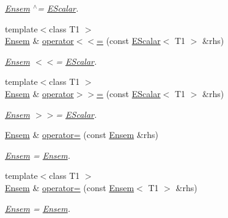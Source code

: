 \begin{DoxyCompactItemize}
\begin{DoxyCompactList}\small\item\em \mbox{\hyperlink{classENSEM_1_1Ensem}{Ensem}} $^\wedge$= \mbox{\hyperlink{classENSEM_1_1EScalar}{E\+Scalar}}. \end{DoxyCompactList}\item 
{\footnotesize template$<$class T1 $>$ }\\\mbox{\hyperlink{classENSEM_1_1Ensem}{Ensem}} \& \mbox{\hyperlink{classENSEM_1_1Ensem_a9aecabccdc31d9b43db877a82879f702}{operator$<$$<$=}} (const \mbox{\hyperlink{classENSEM_1_1EScalar}{E\+Scalar}}$<$ T1 $>$ \&rhs)
\begin{DoxyCompactList}\small\item\em \mbox{\hyperlink{classENSEM_1_1Ensem}{Ensem}} $<$$<$= \mbox{\hyperlink{classENSEM_1_1EScalar}{E\+Scalar}}. \end{DoxyCompactList}\item 
{\footnotesize template$<$class T1 $>$ }\\\mbox{\hyperlink{classENSEM_1_1Ensem}{Ensem}} \& \mbox{\hyperlink{classENSEM_1_1Ensem_a9511b1d1b45de39920d451700eecd4d9}{operator$>$$>$=}} (const \mbox{\hyperlink{classENSEM_1_1EScalar}{E\+Scalar}}$<$ T1 $>$ \&rhs)
\begin{DoxyCompactList}\small\item\em \mbox{\hyperlink{classENSEM_1_1Ensem}{Ensem}} $>$$>$= \mbox{\hyperlink{classENSEM_1_1EScalar}{E\+Scalar}}. \end{DoxyCompactList}\item 
\mbox{\hyperlink{classENSEM_1_1Ensem}{Ensem}} \& \mbox{\hyperlink{classENSEM_1_1Ensem_a2f4f881dde88dfaf425051580e477e6c}{operator=}} (const \mbox{\hyperlink{classENSEM_1_1Ensem}{Ensem}} \&rhs)
\begin{DoxyCompactList}\small\item\em \mbox{\hyperlink{classENSEM_1_1Ensem}{Ensem}} = \mbox{\hyperlink{classENSEM_1_1Ensem}{Ensem}}. \end{DoxyCompactList}\item 
{\footnotesize template$<$class T1 $>$ }\\\mbox{\hyperlink{classENSEM_1_1Ensem}{Ensem}} \& \mbox{\hyperlink{classENSEM_1_1Ensem_a83f34607867df5f1fb9ad887354de48d}{operator=}} (const \mbox{\hyperlink{classENSEM_1_1Ensem}{Ensem}}$<$ T1 $>$ \&rhs)
\begin{DoxyCompactList}\small\item\em \mbox{\hyperlink{classENSEM_1_1Ensem}{Ensem}} = \mbox{\hyperlink{classENSEM_1_1Ensem}{Ensem}}. \end{DoxyCompactList}\item 

\end{DoxyCompactItemize}
